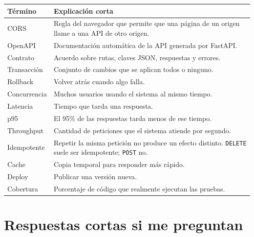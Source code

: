 \documentclass[11pt,a4paper]{article}
\newcommand{\code}[1]{\texttt{#1}}
\begin{document}
\begin{tabularx}{\linewidth}{@{}p{3cm}X@{}}
\toprule
\textbf{Término} & \textbf{Explicación corta} \\
\midrule
CORS & Regla del navegador que permite que una página de un origen llame a
  una API de otro origen. \\
OpenAPI & Documentación automática de la API generada por FastAPI. \\
Contrato & Acuerdo sobre rutas, claves JSON, respuestas y errores. \\
Transacción & Conjunto de cambios que se aplican todos o ninguno. \\
Rollback & Volver atrás cuando algo falla. \\
Concurrencia & Muchos usuarios usando el sistema al mismo tiempo. \\
Latencia & Tiempo que tarda una respuesta. \\
p95 & El 95\% de las respuestas tarda menos de ese tiempo. \\
Throughput & Cantidad de peticiones que el sistema atiende por segundo. \\
Idempotente & Repetir la misma petición no produce un efecto distinto.
  \code{DELETE} suele ser idempotente; \code{POST} no. \\
Cache & Copia temporal para responder más rápido. \\
Deploy & Publicar una versión nueva. \\
Cobertura & Porcentaje de código que realmente ejecutan las pruebas. \\
\bottomrule
\end{tabularx}

\section{Respuestas cortas si me preguntan}
\end{document}

